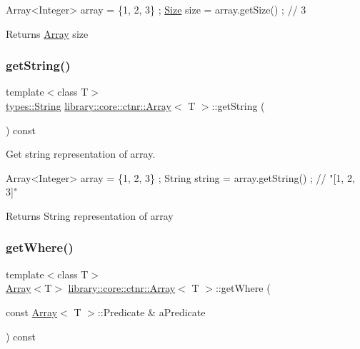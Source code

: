 \begin{DoxyCode}
Array<Integer> array = \{1, 2, 3\} ;
\hyperlink{_size_8hpp_a701626ea1027888ebbb8cfd0ff7adab0}{Size} size = array.getSize() ; \textcolor{comment}{// 3}
\end{DoxyCode}


\begin{DoxyReturn}{Returns}
\hyperlink{classlibrary_1_1core_1_1ctnr_1_1_array}{Array} size 
\end{DoxyReturn}
\mbox{\label{classlibrary_1_1core_1_1ctnr_1_1_array_a6a3416cc26d2968239af631d946ba11b}} 
\subsubsection{\texorpdfstring{get\+String()}{getString()}}
{\footnotesize\ttfamily template$<$class T$>$ \\
\hyperlink{classlibrary_1_1core_1_1types_1_1_string}{types\+::\+String} \hyperlink{classlibrary_1_1core_1_1ctnr_1_1_array}{library\+::core\+::ctnr\+::\+Array}$<$ T $>$\+::get\+String (\begin{DoxyParamCaption}{ }\end{DoxyParamCaption}) const}



Get string representation of array. 


\begin{DoxyCode}
Array<Integer> array = \{1, 2, 3\} ;
String \textcolor{keywordtype}{string} = array.getString() ; \textcolor{comment}{// "[1, 2, 3]"}
\end{DoxyCode}


\begin{DoxyReturn}{Returns}
String representation of array 
\end{DoxyReturn}
\mbox{\label{classlibrary_1_1core_1_1ctnr_1_1_array_a62069b24d593b2265422cb8f3a149c44}} 
\subsubsection{\texorpdfstring{get\+Where()}{getWhere()}}
{\footnotesize\ttfamily template$<$class T$>$ \\
\hyperlink{classlibrary_1_1core_1_1ctnr_1_1_array}{Array}$<$T$>$ \hyperlink{classlibrary_1_1core_1_1ctnr_1_1_array}{library\+::core\+::ctnr\+::\+Array}$<$ T $>$\+::get\+Where (\begin{DoxyParamCaption}\item[{const \hyperlink{classlibrary_1_1core_1_1ctnr_1_1_array}{Array}$<$ T $>$\+::Predicate \&}]{a\+Predicate }\end{DoxyParamCaption}) const}



